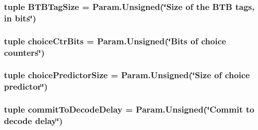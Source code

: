 \label{classOzoneCPU_1_1DerivOzoneCPU_af08b7bde310be401d556775d6f7022c8}
\hypertarget{classOzoneCPU_1_1DerivOzoneCPU_ad8cca86a44213bc6d3bd04b3447079d8}{
\subsubsection[{BTBTagSize}]{\setlength{\rightskip}{0pt plus 5cm}tuple {\bf BTBTagSize} = Param.Unsigned(\char`\"{}Size of the BTB tags, in bits\char`\"{})}}
\label{classOzoneCPU_1_1DerivOzoneCPU_ad8cca86a44213bc6d3bd04b3447079d8}
\hypertarget{classOzoneCPU_1_1DerivOzoneCPU_ae5455b064804378b4ec6f8094452896d}{
\subsubsection[{choiceCtrBits}]{\setlength{\rightskip}{0pt plus 5cm}tuple {\bf choiceCtrBits} = Param.Unsigned(\char`\"{}Bits of choice counters\char`\"{})}}
\label{classOzoneCPU_1_1DerivOzoneCPU_ae5455b064804378b4ec6f8094452896d}
\hypertarget{classOzoneCPU_1_1DerivOzoneCPU_acd59ddeaa888aee8a086f93d0ce0afbc}{
\subsubsection[{choicePredictorSize}]{\setlength{\rightskip}{0pt plus 5cm}tuple {\bf choicePredictorSize} = Param.Unsigned(\char`\"{}Size of choice predictor\char`\"{})}}
\label{classOzoneCPU_1_1DerivOzoneCPU_acd59ddeaa888aee8a086f93d0ce0afbc}
\hypertarget{classOzoneCPU_1_1DerivOzoneCPU_acaab18e678264ee264642b5be0d91157}{
\subsubsection[{commitToDecodeDelay}]{\setlength{\rightskip}{0pt plus 5cm}tuple {\bf commitToDecodeDelay} = Param.Unsigned(\char`\"{}Commit to decode delay\char`\"{})}}
